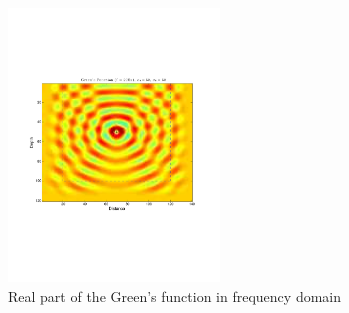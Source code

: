 \documentclass[12pt]{article}
\theoremstyle{plain}
\theoremstyle{definition}
\theoremstyle{remark}
\numberwithin{equation}{section}
\begin{document}
  \begin{figure}
  \centering
  \includegraphics[width=0.5\textwidth]{Fig/GreensFunction.pdf}
  \caption{Real part of the Green's function in frequency domain} 
  \end{figure}
\end{document}

